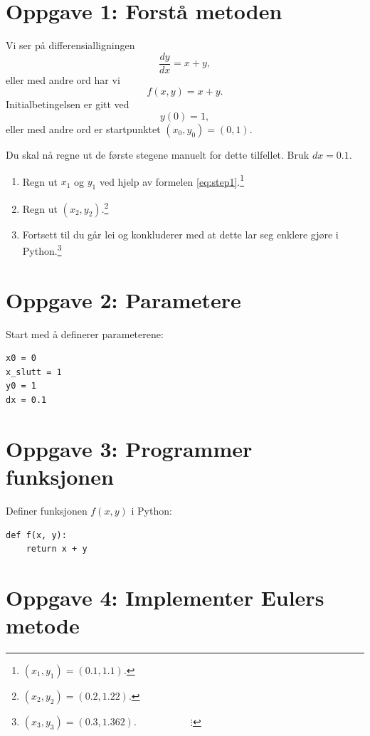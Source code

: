 \documentclass[a4paper,12pt]{article}
\begin{document}
\section*{Oppgave 1: Forstå metoden}

Vi ser på differensialligningen
\begin{equation}
\frac{dy}{dx} = x + y,
\label{eq:diff1}
\end{equation}
eller med andre ord har vi \[f(x,y) = x + y.\]
Initialbetingelsen er gitt ved
\[
y(0) = 1,
\]
eller med andre ord er startpunktet $(x_0,y_0) = (0,1)$.
\newline

Du skal nå regne ut de første stegene manuelt for dette tilfellet. Bruk $dx=0.1$.

\begin{enumerate}[label=\alph*)]
\item Regn ut $x_1$ og $y_1$ ved hjelp av formelen \eqref{eq:step1}.\footnote{$(x_1,y_1) = (0.1, 1.1)$.}
\item Regn ut $(x_2,y_2)$.\footnote{$(x_2,y_2) = (0.2, 1.22)$.}
\item Fortsett til du går lei og konkluderer med at dette lar seg enklere gjøre i Python.\footnote{$(x_3,y_3) = (0.3, 1.362)$.\newline$\phantom{mmmmmiii} \vdots$}
\end{enumerate}
\newpage

\section*{Oppgave 2: Parametere}

Start med å definerer parameterene:

\begin{lstlisting}
x0 = 0
x_slutt = 1
y0 = 1
dx = 0.1
\end{lstlisting}

\section*{Oppgave 3: Programmer funksjonen}

Definer funksjonen $f(x,y)$ i Python:

\begin{lstlisting}
def f(x, y):
    return x + y
\end{lstlisting}


\section*{Oppgave 4: Implementer Eulers metode}
\end{document}
